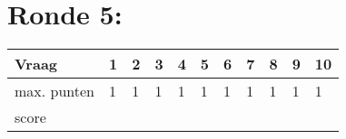 




\begin{center}
\end{center}
\vspace{5mm}
 
 
\vspace{5mm}
 
\section{Ronde 5:}
\begin{questions}

\end{questions}
\begin{table}[!b]
\centering
\begin{tabular}{|l|l|l|l|l|l|l|l|l|l|l|}
\hline
Vraag       & 1 & 2 & 3 & 4 & 5 & 6 & 7 & 8 & 9 & 10 \\ \hline
max. punten & 1 & 1 & 1 & 1 & 1 & 1 & 1 & 1 & 1 & 1  \\ \hline
score       &   &   &   &   &   &   &   &   &   &    \\ \hline
\end{tabular}
\end{table}
\newpage
